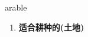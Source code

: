 
\begin{frame}
{\huge arable}
\begin{center}
\begin{enumerate}\Large
  \item \textbf{适合耕种的(土地)}
\end{enumerate}
\end{center}
\end{frame}
